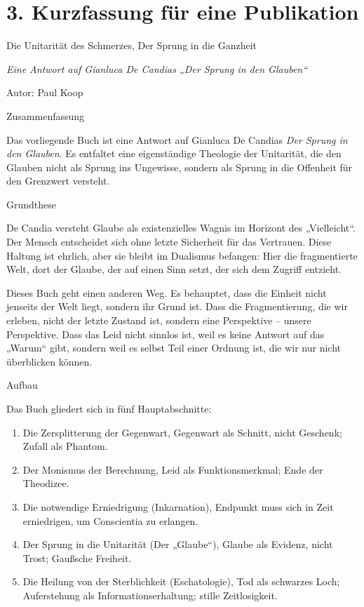 \documentclass[
  ngerman,
]{article}
\begin{document}
\section{\texorpdfstring{\hfill\break
}{ }}\label{section-10}

\section{\texorpdfstring{\textbf{3. Kurzfassung für eine
Publikation}}{3. Kurzfassung für eine Publikation}}\label{kurzfassung-fuxfcr-eine-publikation}

Die Unitarität des Schmerzes, Der Sprung in die Ganzheit

\emph{Eine Antwort auf Gianluca De Candias „Der Sprung in den Glauben``}

Autor: Paul Koop

Zusammenfassung

Das vorliegende Buch ist eine Antwort auf Gianluca De Candias \emph{Der
Sprung in den Glauben}. Es entfaltet eine eigenständige Theologie der
Unitarität, die den Glauben nicht als Sprung ins Ungewisse, sondern als
Sprung in die Offenheit für den Grenzwert versteht.

Grundthese

De Candia versteht Glaube als existenzielles Wagnis im Horizont des
„Vielleicht``. Der Mensch entscheidet sich ohne letzte Sicherheit für
das Vertrauen. Diese Haltung ist ehrlich, aber sie bleibt im Dualismus
befangen: Hier die fragmentierte Welt, dort der Glaube, der auf einen
Sinn setzt, der sich dem Zugriff entzieht.

Dieses Buch geht einen anderen Weg. Es behauptet, dass die Einheit nicht
jenseits der Welt liegt, sondern ihr Grund ist. Dass die Fragmentierung,
die wir erleben, nicht der letzte Zustand ist, sondern eine Perspektive
-- unsere Perspektive. Dass das Leid nicht sinnlos ist, weil es keine
Antwort auf das „Warum`` gibt, sondern weil es selbst Teil einer Ordnung
ist, die wir nur nicht überblicken können.

Aufbau

Das Buch gliedert sich in fünf Hauptabschnitte:

\begin{enumerate}
\def\labelenumi{\arabic{enumi}.}
\item
  Die Zersplitterung der Gegenwart, Gegenwart als Schnitt, nicht
  Geschenk; Zufall als Phantom.
\item
  Der Monismus der Berechnung, Leid als Funktionsmerkmal; Ende der
  Theodizee.
\item
  Die notwendige Erniedrigung (Inkarnation), Endpunkt muss sich in
  Zeit erniedrigen, um Conscientia zu erlangen.
\item
  Der Sprung in die Unitarität (Der „Glaube``), Glaube als Evidenz,
  nicht Trost; Gaußsche Freiheit.
\item
  Die Heilung von der Sterblichkeit (Eschatologie), Tod als schwarzes
  Loch; Auferstehung als Informationserhaltung; stille Zeitlosigkeit.
\end{enumerate}
\end{document}
